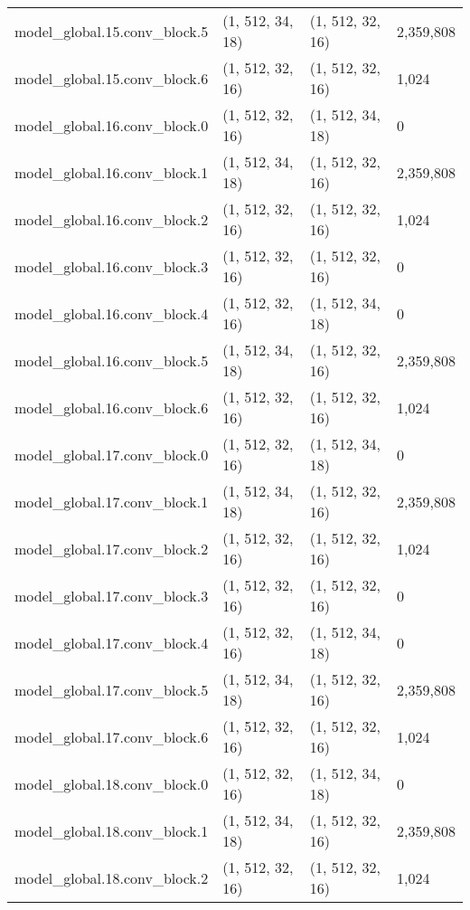\begin{longtable}{llll}
        model\_global.15.conv\_block.5 &   (1, 512, 34, 18) &   (1, 512, 32, 16) &   2,359,808 \\
        model\_global.15.conv\_block.6 &   (1, 512, 32, 16) &   (1, 512, 32, 16) &       1,024 \\
        model\_global.16.conv\_block.0 &   (1, 512, 32, 16) &   (1, 512, 34, 18) &           0 \\
        model\_global.16.conv\_block.1 &   (1, 512, 34, 18) &   (1, 512, 32, 16) &   2,359,808 \\
        model\_global.16.conv\_block.2 &   (1, 512, 32, 16) &   (1, 512, 32, 16) &       1,024 \\
        model\_global.16.conv\_block.3 &   (1, 512, 32, 16) &   (1, 512, 32, 16) &           0 \\
        model\_global.16.conv\_block.4 &   (1, 512, 32, 16) &   (1, 512, 34, 18) &           0 \\
        model\_global.16.conv\_block.5 &   (1, 512, 34, 18) &   (1, 512, 32, 16) &   2,359,808 \\
        model\_global.16.conv\_block.6 &   (1, 512, 32, 16) &   (1, 512, 32, 16) &       1,024 \\
        model\_global.17.conv\_block.0 &   (1, 512, 32, 16) &   (1, 512, 34, 18) &           0 \\
        model\_global.17.conv\_block.1 &   (1, 512, 34, 18) &   (1, 512, 32, 16) &   2,359,808 \\
        model\_global.17.conv\_block.2 &   (1, 512, 32, 16) &   (1, 512, 32, 16) &       1,024 \\
        model\_global.17.conv\_block.3 &   (1, 512, 32, 16) &   (1, 512, 32, 16) &           0 \\
        model\_global.17.conv\_block.4 &   (1, 512, 32, 16) &   (1, 512, 34, 18) &           0 \\
        model\_global.17.conv\_block.5 &   (1, 512, 34, 18) &   (1, 512, 32, 16) &   2,359,808 \\
        model\_global.17.conv\_block.6 &   (1, 512, 32, 16) &   (1, 512, 32, 16) &       1,024 \\
        model\_global.18.conv\_block.0 &   (1, 512, 32, 16) &   (1, 512, 34, 18) &           0 \\
        model\_global.18.conv\_block.1 &   (1, 512, 34, 18) &   (1, 512, 32, 16) &   2,359,808 \\
        model\_global.18.conv\_block.2 &   (1, 512, 32, 16) &   (1, 512, 32, 16) &       1,024 \\

\end{longtable}
